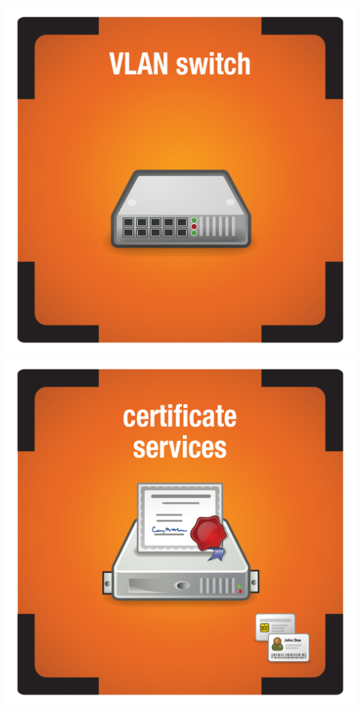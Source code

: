 \documentclass{letter}
\begin{document}
\includegraphics{tiles/node_vlan_switch_compromised}
\includegraphics{tiles/node_cert_services_compromised} \\
\end{document}
